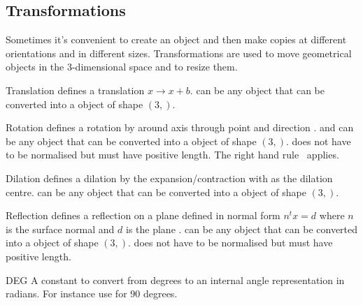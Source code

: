 \subsection{Transformations}

Sometimes it's convenient to create an object and then make copies at
different orientations and in different sizes.  Transformations are
used to move geometrical objects in the 3-dimensional space and to
resize them.

\begin{classdesc}{Translation}{}
defines a translation $x \to x+b$.  can be any object that can be converted
into a \numpy object of shape $(3,)$.
\end{classdesc}

\begin{classdesc}{Rotation}{ }
defines a rotation by  around axis through point  and direction .
 and  can be any object that can be converted
into a \numpy object of shape $(3,)$.
 does not have to be normalised but must have positive length. The right hand rule~\cite{RIGHTHANDRULE}
applies.
\end{classdesc}


\begin{classdesc}{Dilation}{}
defines a dilation by the expansion/contraction  with
 as the dilation centre.
 can be any object that can be converted
into a \numpy object of shape $(3,)$.
\end{classdesc}

\begin{classdesc}{Reflection}{}
defines a reflection on a plane defined in normal form $n^t x = d$
where $n$ is the surface normal  and $d$ is the plane .
 can be any object that can be converted
into a \numpy object of shape $(3,)$.
 does not have to be normalised but must have positive length.
\end{classdesc}

\begin{datadesc}{DEG}
A constant to convert from degrees to an internal angle representation in radians. For instance use  for $90$ degrees.
\end{datadesc}

